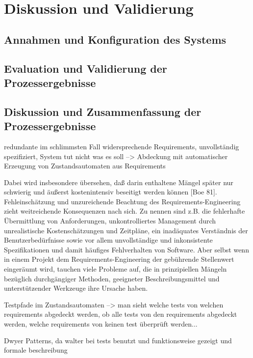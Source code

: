 

\chapter{Diskussion und Validierung}
\label{chap:Validation}
\section{Annahmen und Konfiguration des Systems}
\label{sec:Assumptions_Setup}
\section{Evaluation und Validierung der Prozessergebnisse}
\label{sec:eval__valid_Results}
\section{Diskussion und Zusammenfassung der Prozessergebnisse}
\label{sec:disc_concl_Results}
redundante im schlimmsten Fall widersprechende Requirements, unvollständig spezifiziert, System tut nicht was es soll --> Abdeckung mit automatischer Erzeugung von Zustandsautomaten aus Requirements

Dabei wird insbesondere übersehen, daß darin
enthaltene Mängel später nur schwierig und äußerst kostenintensiv beseitigt
werden können [Boe 81].
Fehleinschätzung und unzureichende Beachtung des Requirements-Engineering
zieht weitreichende Konsequenzen nach sich. Zu nennen sind z.B. die fehlerhafte
Übermittlung von Anforderungen, unkontrolliertes Management durch unrealistische
Kostenschätzungen und Zeitpläne, ein inadäquates Verständnis der Benutzerbedürfnisse
sowie vor allem unvollständige und inkonsistente Spezifikationen und
damit häufiges Fehlverhalten von Software.
Aber selbst wenn in einem Projekt dem Requirements-Engineering der gebührende
Stellenwert eingeräumt wird, tauchen viele Probleme auf, die in prinzipiellen
Mängeln bezüglich durchgängiger Methoden, geeigneter Beschreibungsmittel und
unterstützender Werkzeuge ihre Ursache haben. 

Testpfade im Zustandsautomaten --> man sieht welche tests von welchen requirements abgedeckt werden, ob alle tests von den requirements abgedeckt werden, welche requirements von keinen test überprüft werden...

Dwyer Patterns, da walter bei tests benutzt und funktionsweise gezeigt und formale beschreibung
